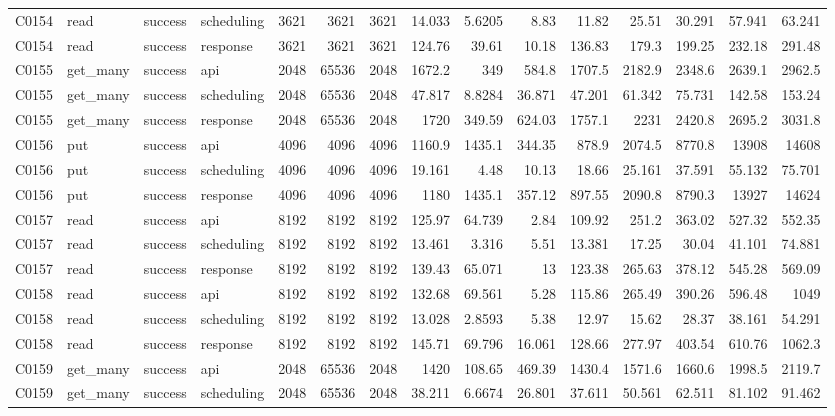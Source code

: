 \begin{landscape}
\begin{longtable}{llllrrrrrrrrrrr}
C0154 & read & success & scheduling & 3621 & 3621 & 3621 & 14.033 & 5.6205 & 8.83 & 11.82 & 25.51 & 30.291 & 57.941 & 63.241\\
C0154 & read & success & response & 3621 & 3621 & 3621 & 124.76 & 39.61 & 10.18 & 136.83 & 179.3 & 199.25 & 232.18 & 291.48\\
C0155 & get\_\allowbreak{}many & success & api & 2048 & 65536 & 2048 & 1672.2 & 349 & 584.8 & 1707.5 & 2182.9 & 2348.6 & 2639.1 & 2962.5\\
C0155 & get\_\allowbreak{}many & success & scheduling & 2048 & 65536 & 2048 & 47.817 & 8.8284 & 36.871 & 47.201 & 61.342 & 75.731 & 142.58 & 153.24\\
C0155 & get\_\allowbreak{}many & success & response & 2048 & 65536 & 2048 & 1720 & 349.59 & 624.03 & 1757.1 & 2231 & 2420.8 & 2695.2 & 3031.8\\
C0156 & put & success & api & 4096 & 4096 & 4096 & 1160.9 & 1435.1 & 344.35 & 878.9 & 2074.5 & 8770.8 & 13908 & 14608\\
C0156 & put & success & scheduling & 4096 & 4096 & 4096 & 19.161 & 4.48 & 10.13 & 18.66 & 25.161 & 37.591 & 55.132 & 75.701\\
C0156 & put & success & response & 4096 & 4096 & 4096 & 1180 & 1435.1 & 357.12 & 897.55 & 2090.8 & 8790.3 & 13927 & 14624\\
C0157 & read & success & api & 8192 & 8192 & 8192 & 125.97 & 64.739 & 2.84 & 109.92 & 251.2 & 363.02 & 527.32 & 552.35\\
C0157 & read & success & scheduling & 8192 & 8192 & 8192 & 13.461 & 3.316 & 5.51 & 13.381 & 17.25 & 30.04 & 41.101 & 74.881\\
C0157 & read & success & response & 8192 & 8192 & 8192 & 139.43 & 65.071 & 13 & 123.38 & 265.63 & 378.12 & 545.28 & 569.09\\
C0158 & read & success & api & 8192 & 8192 & 8192 & 132.68 & 69.561 & 5.28 & 115.86 & 265.49 & 390.26 & 596.48 & 1049\\
C0158 & read & success & scheduling & 8192 & 8192 & 8192 & 13.028 & 2.8593 & 5.38 & 12.97 & 15.62 & 28.37 & 38.161 & 54.291\\
C0158 & read & success & response & 8192 & 8192 & 8192 & 145.71 & 69.796 & 16.061 & 128.66 & 277.97 & 403.54 & 610.76 & 1062.3\\
C0159 & get\_\allowbreak{}many & success & api & 2048 & 65536 & 2048 & 1420 & 108.65 & 469.39 & 1430.4 & 1571.6 & 1660.6 & 1998.5 & 2119.7\\
C0159 & get\_\allowbreak{}many & success & scheduling & 2048 & 65536 & 2048 & 38.211 & 6.6674 & 26.801 & 37.611 & 50.561 & 62.511 & 81.102 & 91.462\\

\end{longtable}
\end{landscape}
